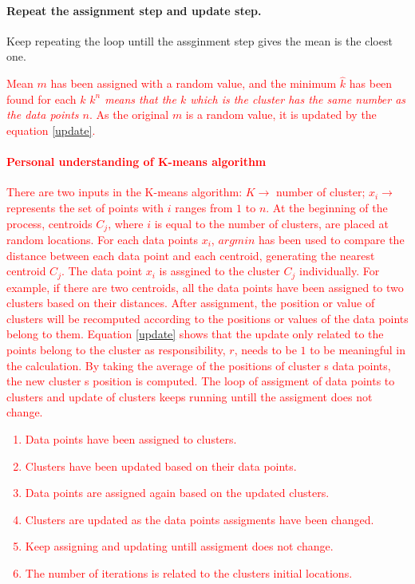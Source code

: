 \documentclass[11pt]{article}
\begin{document}
\paragraph{Repeat the assignment step and update step.}
  Keep repeating the loop untill the assginment step gives the mean is the cloest one.

  \textcolor{red}{Mean $m$ has been assigned with a random value, and the minimum $\hat{k}$ has been found for each $k$ \textit{$k^n$ means that the $k$ which is the cluster has the same number as the data points $n$}. As the original $m$ is a random value, it is updated by the equation \ref{update}.}

\paragraph{\textbf{\textcolor{red}{Personal understanding of K-means algorithm}}}
  \textcolor{red}{There are two inputs in the K-means algorithm: $K \rightarrow$ number of cluster; $x_i \rightarrow$ represents the set of points with $i$ ranges from $1$ to $n$. At the beginning of the process, centroids $C_j$, where $i$ is equal to the number of clusters, are placed at random locations. For each data points $x_i$, $argmin$ has been used to compare the distance between each data point and each centroid, generating the nearest centroid $C_j$. The data point $x_i$ is assgined to the cluster $C_j$ individually. For example, if there are two centroids, all the data points have been assigned to two clusters based on their distances. After assignment, the position or value of clusters will be recomputed according to the positions or values of the data points belong to them. Equation \ref{update} shows that the update only related to the points belong to the cluster as responsibility, $r$, needs to be $1$ to be meaningful in the calculation. By taking the average of the positions of cluster \textquotesingle s data points, the new cluster \textquotesingle s position is computed. The loop of assigment of data points to clusters and update of clusters keeps running untill the assigment does not change.}
\textcolor{red}
{
\begin{enumerate}
  \item Data points have been assigned to clusters.
  \item Clusters have been updated based on their data points.
  \item Data points are assigned again based on the updated clusters.
  \item Clusters are updated as the data points \textquotesingle assigments have been changed.
  \item Keep assigning and updating untill assigment does not change.
  \item The number of iterations is related to the clusters \textquotesingle initial locations.
\end{enumerate}
}
\end{document}
